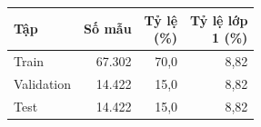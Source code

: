 \begin{tabular}{lrrr}
\toprule
Tập & Số mẫu & \makecell[r]{Tỷ lệ\\(\%)} & \makecell[r]{Tỷ lệ lớp\\1 (\%)} \\
\midrule
Train & 67{.}302 & 70{,}0 & 8{,}82 \\
Validation & 14{.}422 & 15{,}0 & 8{,}82 \\
Test & 14{.}422 & 15{,}0 & 8{,}82 \\
\bottomrule
\end{tabular}
